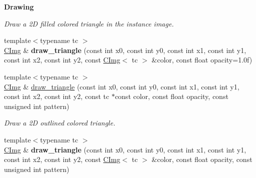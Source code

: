 \begin{Indent}{\bf Drawing}
\begin{DoxyCompactItemize}
\begin{DoxyCompactList}\small\item\em Draw a 2\-D filled colored triangle in the instance image. \end{DoxyCompactList}\item 
\hypertarget{structcimg__library_1_1_c_img_a294b7f3cea13f437afc92edb67d20908}{{\footnotesize template$<$typename tc $>$ }\\\hyperlink{structcimg__library_1_1_c_img}{C\-Img} \& {\bfseries draw\-\_\-triangle} (const int x0, const int y0, const int x1, const int y1, const int x2, const int y2, const \hyperlink{structcimg__library_1_1_c_img}{C\-Img}$<$ tc $>$ \&color, const float opacity=1.\-0f)}\label{structcimg__library_1_1_c_img_a294b7f3cea13f437afc92edb67d20908}

\item 
\hypertarget{structcimg__library_1_1_c_img_a7c13b4cd23d8d4852b52641daa3558be}{{\footnotesize template$<$typename tc $>$ }\\\hyperlink{structcimg__library_1_1_c_img}{C\-Img} \& \hyperlink{structcimg__library_1_1_c_img_a7c13b4cd23d8d4852b52641daa3558be}{draw\-\_\-triangle} (const int x0, const int y0, const int x1, const int y1, const int x2, const int y2, const tc $\ast$const color, const float opacity, const unsigned int pattern)}\label{structcimg__library_1_1_c_img_a7c13b4cd23d8d4852b52641daa3558be}

\begin{DoxyCompactList}\small\item\em Draw a 2\-D outlined colored triangle. \end{DoxyCompactList}\item 
\hypertarget{structcimg__library_1_1_c_img_a0ea066baf1c291841d3cca2276a92cfb}{{\footnotesize template$<$typename tc $>$ }\\\hyperlink{structcimg__library_1_1_c_img}{C\-Img} \& {\bfseries draw\-\_\-triangle} (const int x0, const int y0, const int x1, const int y1, const int x2, const int y2, const \hyperlink{structcimg__library_1_1_c_img}{C\-Img}$<$ tc $>$ \&color, const float opacity, const unsigned int pattern)}\label{structcimg__library_1_1_c_img_a0ea066baf1c291841d3cca2276a92cfb}


\end{DoxyCompactItemize}
\end{Indent}
